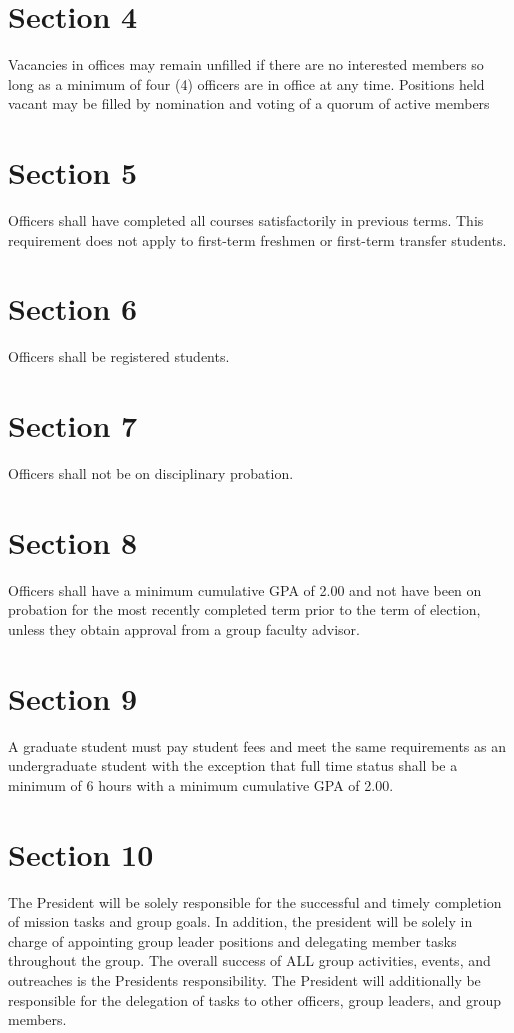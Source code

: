 \documentclass[10pt,letterpaper]{article}
\begin{document}
\section*{Section 4} Vacancies in offices may remain unfilled if there are no interested members so long as a minimum of four (4) officers are in office at any time. Positions held vacant may be filled by nomination and voting of a quorum of active members
\section*{Section 5} Officers shall have completed all courses satisfactorily in previous terms. This requirement does not apply to first-term freshmen or first-term transfer students.
\section*{Section 6} Officers shall be registered students.
\section*{Section 7} Officers shall not be on disciplinary probation.
\section*{Section 8} Officers shall have a minimum cumulative GPA of 2.00 and not have been on probation for the most recently completed term prior to the term of election, unless they obtain approval from a group faculty advisor.
\section*{Section 9} A graduate student must pay student fees and meet the same requirements as an undergraduate student with the exception that full time status shall be a minimum of 6 hours with a minimum cumulative GPA of 2.00.
\section*{Section 10} The President will be solely responsible for the successful and timely completion of mission tasks and group goals. In addition, the president will be solely in charge of appointing group leader positions and delegating member tasks throughout the group. The overall success of ALL group activities, events, and outreaches is the Presidents responsibility. The President will additionally be responsible for the delegation of tasks to other officers, group leaders, and group members.
\end{document}
